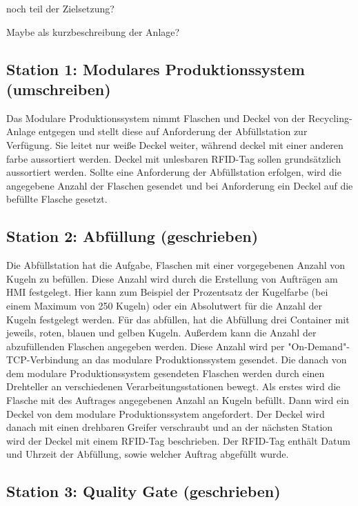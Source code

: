 noch teil der Zielsetzung?

Maybe als kurzbeschreibung der Anlage?

\subsection{Station 1: Modulares Produktionssystem (umschreiben)}\label{sec:Station 1: Modulares Produktionssystem}

Das Modulare Produktionssystem nimmt Flaschen und Deckel von der Recycling-Anlage entgegen und stellt diese auf Anforderung 
der Abfüllstation zur Verfügung. Sie leitet nur weiße Deckel weiter, während deckel mit einer anderen farbe aussortiert 
werden. Deckel mit unlesbaren RFID-Tag sollen grundsätzlich aussortiert werden. Sollte eine Anforderung der Abfüllstation 
erfolgen, wird die angegebene Anzahl der Flaschen gesendet und bei Anforderung ein Deckel auf die befüllte Flasche gesetzt.

\subsection{Station 2: Abfüllung (geschrieben)}\label{sec:Station 2: Abfüllung}

Die Abfüllstation hat die Aufgabe, Flaschen mit einer vorgegebenen Anzahl von Kugeln zu befüllen. Diese Anzahl wird durch 
die Erstellung von Aufträgen am HMI festgelegt. Hier kann zum Beispiel der Prozentsatz der Kugelfarbe (bei einem Maximum 
von 250 Kugeln) oder ein Absolutwert für die Anzahl der Kugeln festgelegt werden. Für das abfüllen, hat die Abfüllung drei 
Container mit jeweils, roten, blauen und gelben Kugeln. Außerdem kann die Anzahl der abzufüllenden Flaschen angegeben 
werden. Diese Anzahl wird per "On-Demand"-TCP-Verbindung an das modulare Produktionssystem gesendet. Die danach von dem 
modulare Produktionssystem gesendeten Flaschen werden durch einen Drehteller an verschiedenen Verarbeitungsstationen bewegt. 
Als erstes wird die Flasche mit des Auftrages angegebenen Anzahl an Kugeln befüllt. Dann wird ein Deckel von dem modulare 
Produktionssystem angefordert. Der Deckel wird danach mit einen drehbaren Greifer verschraubt und an der nächsten Station 
wird der Deckel mit einem RFID-Tag beschrieben. Der RFID-Tag enthält Datum und Uhrzeit der Abfüllung, sowie welcher Auftrag 
abgefüllt wurde. 

\subsection{Station 3: Quality Gate (geschrieben)}\label{sec:Station 3: Quality Gate}


